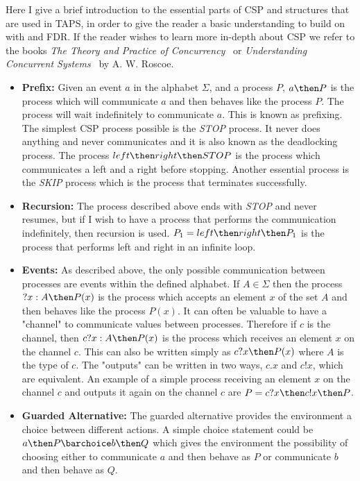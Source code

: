Here I give a brief introduction to the essential parts of CSP and structures that are used in TAPS, in order to give the reader a basic understanding to build on with \cspm{} and FDR. If the reader wishes to learn more in-depth about CSP we refer to the books \textit{The Theory and Practice of Concurrency}~\cite{Roscoe1997} or \textit{Understanding Concurrent Systems}~\cite{Roscoe2010} by A. W. Roscoe.
\begin{itemize}
    \item \textbf{Prefix:} Given an event $a$ in the alphabet $\Sigma$, and a process $P$, $a \then P$ is the process which will communicate $a$ and then behaves like the process $P$. The process will wait indefinitely to communicate $a$. This is known as prefixing.
    The simplest CSP process possible is the \textit{STOP} process. It never does anything and never communicates and it is also known as the deadlocking process. The process $left \then right \then STOP$ is the process which communicates a left and a right before stopping. Another essential process is the \textit{SKIP} process which is the process that terminates successfully.
    \item \textbf{Recursion:} The process described above ends with \textit{STOP} and never resumes, but if I wish to have a process that performs the communication indefinitely, then recursion is used.
    $P_1 = left \then right \then P_1$ is the process that performs left and right in an infinite loop.
    \item \textbf{Events:} As described above, the only possible communication between processes are events within the defined alphabet. If $A \in \Sigma$ then the process $?x : A \then P(x)$ is the process which accepts an element $x$ of the set $A$ and then behaves like the process $P(x)$.
    It can often be valuable to have a "channel" to communicate values between processes. Therefore if $c$ is the channel, then $c?x : A \then P(x)$ is the process which receives an element $x$ on the channel $c$. This can also be written simply as $c?x \then P(x)$ where $A$ is the type of $c$. The "outputs" can be written in two ways, $c.x$ and $c!x$, which are equivalent. An example of a simple process receiving an element $x$ on the channel $c$ and outputs it again on the channel $c$ are $P = c?x \then c!x \then P$.
    \item \textbf{Guarded Alternative:} The guarded alternative provides the environment a choice between different actions. A simple choice statement could be $a \then P \barchoice b \then Q$ which gives the environment the possibility of choosing either to communicate $a$ and then behave as $P$ or communicate $b$ and then behave as $Q$.

\end{itemize}
